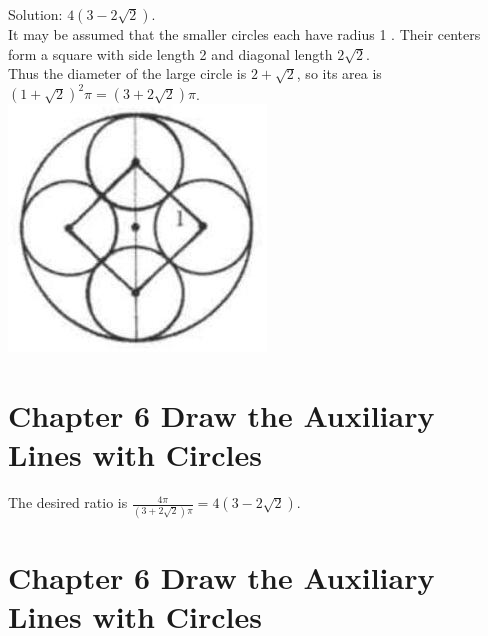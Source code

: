 \documentclass[10pt]{article}
\begin{document}
Solution: \(4(3-2 \sqrt{2})\).\\
It may be assumed that the smaller circles each have radius 1 . Their centers form a square with side length 2 and diagonal length \(2 \sqrt{2}\).\\
Thus the diameter of the large circle is \(2+\sqrt{2}\), so its area is \((1+\sqrt{2})^{2} \pi=(3+2 \sqrt{2}) \pi\).\\
\includegraphics[max width=\textwidth, center]{2025_04_17_97bc1f7e44d93c271a88g-182(2)}

\section*{Chapter 6 Draw the Auxiliary Lines with Circles}
The desired ratio is \(\frac{4 \pi}{(3+2 \sqrt{2}) \pi}=4(3-2 \sqrt{2})\).

\section*{Chapter 6 Draw the Auxiliary Lines with Circles}
\end{document}
